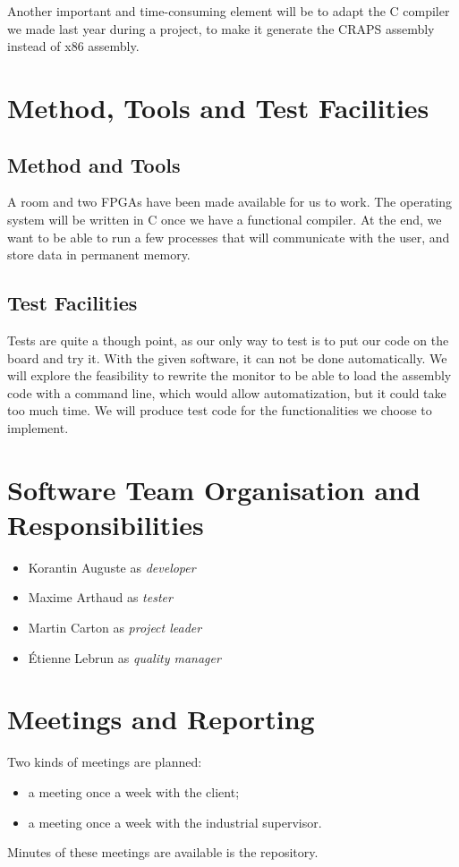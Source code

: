 \documentclass{article}
\begin{document}
    Another important and time-consuming element will be to adapt the C compiler
    we made last year during a project, to make it generate the CRAPS assembly
    instead of x86 assembly.

  \section{Method, Tools and Test Facilities}
    \subsection{Method and Tools}
    A room and two FPGAs have been made available for us to work.
    The operating system will be written in C once we have a functional
    compiler.
    At the end, we want to be able to run a few processes that will communicate
    with the user, and store data in permanent memory.

     \subsection{Test Facilities}
    Tests are quite a though point, as our only way to test is to put
    our code on the board and try it. With the given software, it can not be
    done automatically.
    We will explore the feasibility to rewrite the monitor to be able to load
    the assembly code with a command line, which would allow automatization, but
    it could take too much time.
    We will produce test code for the functionalities we choose to implement.

  \section{Software Team Organisation and Responsibilities}
    \begin{itemize}
      \item Korantin Auguste as \textit{developer}
      \item Maxime Arthaud as \textit{tester}
      \item Martin Carton as \textit{project leader}
      \item Étienne Lebrun as \textit{quality manager}
    \end{itemize}

  \section{Meetings and Reporting}
    Two kinds of meetings are planned:
    \begin{itemize}
        \item a meeting once a week with the client;
        \item a meeting once a week with the industrial supervisor.
    \end{itemize}
    Minutes of these meetings are available is the repository.
\end{document}
